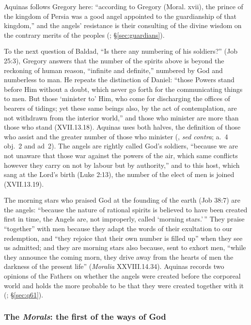 \noindent Aquinas follows Gregory here: ``according to Gregory (Moral. xvii),
the prince of the kingdom of Persia was a good angel appointed to the
guardianship of that kingdom,'' and the angels' resistance is their
consulting of the divine wisdom on the contrary merits of the peoples
(; \S\ref{sec:guardians}).

To the next question of Baldad, ``Is there any numbering of his soldiers?''
(Job 25:3), Gregory answers that the number of the spirits above is beyond
the reckoning of human reason, ``infinite and definite,'' numbered by God and
numberless to man. He repeats the distinction of Daniel: ``those Powers stand
before Him without a doubt, which never go forth for the communicating things
to men. But those `minister to' Him, who come for discharging the offices of
bearers of tidings; yet these same beings also, by the act of contemplation,
are not withdrawn from the interior world,'' and those who minister are more
than those who stand (XVII.13.18). Aquinas uses both halves, the definition
of those who assist and the greater number of those who minister (, \emph{sed contra}; a.~4 obj.~2 and ad~2). The angels are rightly
called God's soldiers, ``because we are not unaware that those war against
the powers of the air, which same conflicts however they carry on not by
labour but by authority,'' and to this host, which sang at the Lord's birth
(Luke 2:13), the number of the elect of men is joined (XVII.13.19).

The morning stars who praised God at the founding of the earth (Job 38:7) are
the angels: ``because the nature of rational spirits is believed to have
been created first in time, the Angels are, not improperly, called `morning
stars.'\,'' They praise ``together'' with men because they adapt the words of
their exultation to our redemption, and ``they rejoice that their own number
is filled up'' when they see us admitted; and they are morning stars also
because, sent to exhort men, ``while they announce the coming morn, they
drive away from the hearts of men the darkness of the present life''
(\emph{Moralia} XXVIII.14.34). Aquinas records two opinions of the Fathers
on whether the angels were created before the corporeal world and holds the
more probable to be that they were created together with it (; \S\ref{sec:q61}).

\subsubsection{The \emph{Morals}: the first of the ways of God}

